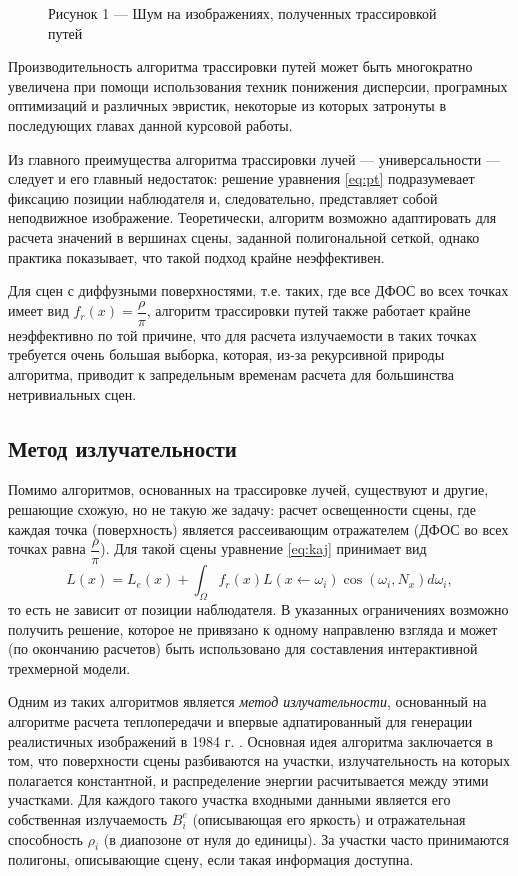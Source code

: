 \documentclass[12pt]{article}
\begin{document}
\begin{figure}[h]
\caption*{Рисунок 1 --- Шум на изображениях, полученных трассировкой путей}
\end{figure}

Производительность алгоритма трассировки путей может быть многократно увеличена при помощи использования техник понижения дисперсии, програмных оптимизаций и различных эвристик, некоторые из которых затронуты в последующих главах данной курсовой работы.

Из главного преимущества алгоритма трассировки лучей --- универсальности --- следует и его главный недостаток: решение уравнения \eqref{eq:pt} подразумевает фиксацию позиции наблюдателя и, следовательно, представляет собой неподвижное изображение. Теоретически, алгоритм возможно адаптировать для расчета значений в вершинах сцены, заданной полигональной сеткой, однако практика показывает, что такой подход крайне неэффективен.

Для сцен с диффузными поверхностями, т.е. таких, где все ДФОС во всех точках имеет вид $f_r(x) = \dfrac{\rho}{\pi}$, алгоритм трассировки путей также работает крайне неэффективно по той причине, что для расчета излучаемости в таких точках требуется очень большая выборка, которая, из-за рекурсивной природы алгоритма, приводит к запредельным временам расчета для большинства нетривиальных сцен.
\subsection{Метод излучательности}
Помимо алгоритмов, основанных на трассировке лучей, существуют и другие, решающие схожую, но не такую же задачу: расчет освещенности сцены, где каждая точка (поверхность) является рассеивающим отражателем (ДФОС во всех точках равна $\dfrac{\rho}{\pi}$). Для такой сцены уравнение \eqref{eq:kaj} принимает вид
\begin{equation}
L(x) = L_e(x) + \int_{\Omega} f_r(x) L(x \leftarrow \omega_i) \cos(\omega_i, N_x) d \omega_i, \label{eq:diff-kaj}
\end{equation}
то есть не зависит от позиции наблюдателя. В указанных ограничениях возможно получить решение, которое не привязано к одному направленю взгляда и может (по окончанию расчетов) быть использовано для составления интерактивной трехмерной модели.

Одним из таких алгоритмов является \emph{метод излучательности}, основанный на алгоритме расчета теплопередачи и впервые адпатированный для генерации реалистичных изображений в 1984 г. \cite{Gor84}. Основная идея алгоритма заключается в том, что поверхности сцены разбиваются на участки, излучательность на которых полагается константной, и распределение энергии расчитывается между этими участками. Для каждого такого участка входными данными является его собственная излучаемость $B_i^e$ (описывающая его яркость) и отражательная способность $\rho_i$ (в диапозоне от нуля до единицы). За участки часто принимаются полигоны, описывающие сцену, если такая информация доступна.
\end{document}
